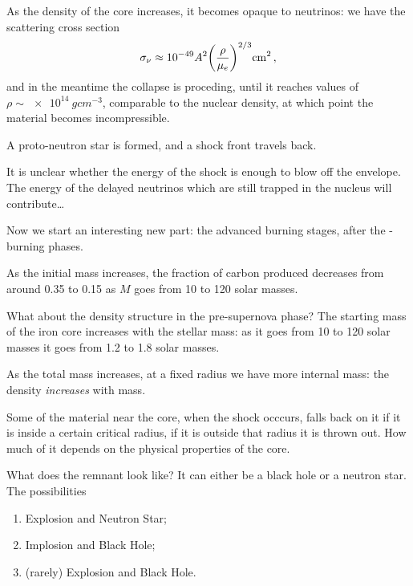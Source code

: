 \documentclass[main.tex]{subfiles}
\begin{document}
As the density of the core increases, it becomes opaque to neutrinos: we have the scattering cross section 
%
\begin{align}
  \sigma_{\nu } \approx \num{e-49} A^2 \qty(\frac{\rho }{\mu_{e}})^{2/3} \SI{}{cm^2}
\,,
\end{align}
%
and in the meantime the collapse is proceding, until it reaches values of \(\rho \sim \SI{e14}{g cm^{-3}}\), comparable to the nuclear density, at which point the material becomes incompressible. 

A proto-neutron star is formed, and a shock front travels back. 


It is unclear whether the energy of the shock is enough to blow off the envelope. The energy of the delayed neutrinos which are still trapped in the nucleus will contribute\dots

Now we start an interesting new part: the advanced burning stages, after the -burning phases. 

As the initial mass increases, the fraction of carbon produced decreases from around \num{.35} to \num{.15} as \(M\) goes from 10 to 120 solar masses. 

What about the density structure in the pre-supernova phase? 
The starting mass of the iron core increases with the stellar mass: as it goes from 10 to 120 solar masses it goes from 1.2 to 1.8 solar masses. 

As the total mass increases, at a fixed radius we have more internal mass: the density \emph{increases} with mass. 

Some of the material near the core, when the shock occcurs, falls back on it if it is inside a certain critical radius, if it is outside that radius it is thrown out. 
How much of it depends on the physical properties of the core. 

What does the remnant look like? It can either be a black hole or a neutron star. The possibilities 
\begin{enumerate}
    \item Explosion and Neutron Star;
    \item Implosion and Black Hole;
    \item (rarely) Explosion and Black Hole.
\end{enumerate}
\end{document}
